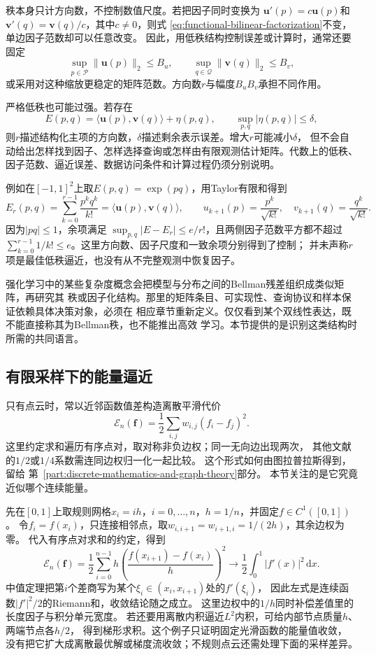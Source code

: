 秩本身只计方向数，不控制数值尺度。若把因子同时变换为
$\bm{u}'(p)=c\bm{u}(p)$和
$\bm{v}'(q)=\bm{v}(q)/c$，其中$c\neq0$，则式
\eqref{eq:functional-bilinear-factorization}不变，单边因子范数却可以任意改变。
因此，用低秩结构控制误差或计算时，通常还要固定
\[
  \sup_{p\in\mathcal{P}}\lVert\bm{u}(p)\rVert_2\leq B_u,
  \qquad
  \sup_{q\in\mathcal{Q}}\lVert\bm{v}(q)\rVert_2\leq B_v,
\]
或采用对这种缩放更稳定的矩阵范数。方向数$r$与幅度$B_uB_v$承担不同作用。

严格低秩也可能过强。若存在
\[
  E(p,q)
  =
  \langle\bm{u}(p),\bm{v}(q)\rangle+\eta(p,q),
  \qquad
  \sup_{p,q}|\eta(p,q)|\leq\delta,
\]
则$r$描述结构化主项的方向数，$\delta$描述剩余表示误差。增大$r$可能减小$\delta$，
但不会自动给出怎样找到因子、怎样选择查询或怎样由有限观测估计矩阵。代数上的低秩、
因子范数、逼近误差、数据访问条件和计算过程仍须分别说明。

例如在$[-1,1]^2$上取$E(p,q)=\exp(pq)$，用Taylor有限和得到
\[
 E_r(p,q)=\sum_{k=0}^{r-1}\frac{p^kq^k}{k!}
 =\langle\bm u(p),\bm v(q)\rangle,\qquad
 u_{k+1}(p)=\frac{p^k}{\sqrt{k!}},\quad
 v_{k+1}(q)=\frac{q^k}{\sqrt{k!}}.
\]
因为$|pq|\leq1$，余项满足
$\sup_{p,q}|E-E_r|\leq e/r!$，且两侧因子范数平方都不超过
$\sum_{k=0}^{r-1}1/k!\leq e$。这里方向数、因子尺度和一致余项分别得到了控制；
并未声称$r$项是最佳低秩逼近，也没有从不完整观测中恢复因子。

强化学习中的某些复杂度概念会把模型与分布之间的Bellman残差组织成类似矩阵，再研究其
秩或因子化结构。那里的矩阵条目、可实现性、查询协议和样本保证依赖具体决策对象，必须在
相应章节重新定义。仅仅看到某个双线性表达，既不能直接称其为Bellman秩，也不能推出高效
学习。本节提供的是识别这类结构时所需的共同语言。

\subsection{有限采样下的能量逼近}
\label{sec:functional-sampled-energy-approximation}
\label{sec:geometry-sampled-geometric-operators}

只有点云时，常以近邻函数值差构造离散平滑代价
\[
 \mathcal E_n(\bm f)=\frac12\sum_{i,j}w_{i,j}(f_i-f_j)^2.
\]
这里约定求和遍历有序点对，取对称非负边权；同一无向边出现两次，
其他文献的$1/2$或$1/4$系数需连同边权归一化一起比较。
这个形式如何由图拉普拉斯得到，留给
第~\ref{part:discrete-mathematics-and-graph-theory}部分。
本节关注的是它究竟近似哪个连续能量。

先在$[0,1]$上取规则网格$x_i=ih$，$i=0,\ldots,n$，$h=1/n$，并固定$f\in C^1([0,1])$。
令$f_i=f(x_i)$，只连接相邻点，取$w_{i,i+1}=w_{i+1,i}=1/(2h)$，其余边权为零。
代入有序点对求和的约定，得到
\[
 \mathcal E_n(\bm f)=\frac12\sum_{i=0}^{n-1}h
 \left(\frac{f(x_{i+1})-f(x_i)}h\right)^2
 \longrightarrow\frac12\int_0^1|f'(x)|^2\,\mathrm dx.
\]
中值定理把第$i$个差商写为某个$\xi_i\in(x_i,x_{i+1})$处的$f'(\xi_i)$，
因此左式是连续函数$|f'|^2/2$的Riemann和，收敛结论随之成立。
这里边权中的$1/h$同时补偿差值里的长度因子与积分单元宽度。
若还要用离散内积逼近$L^2$内积，可给内部节点质量$h$、两端节点各$h/2$，
得到梯形求积。这个例子只证明固定光滑函数的能量值收敛，
没有把它扩大成离散最优解或梯度流收敛；不规则点云还需处理下面的采样差异。


